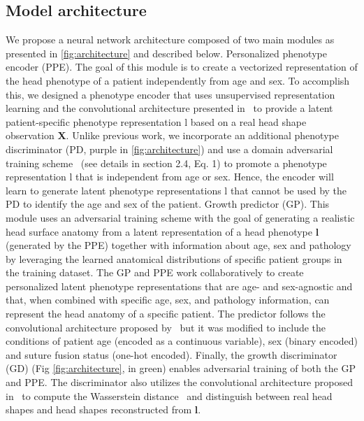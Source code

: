\documentclass[conference]{IEEEtran}
\begin{document}
\subsection{Model architecture}
We propose a neural network architecture composed of two main modules as presented in \ref{fig:architecture} and described below.
Personalized phenotype encoder (PPE). The goal of this module is to create a vectorized representation of the head phenotype of a patient independently from age and sex. To accomplish this, we designed a phenotype encoder that uses unsupervised representation learning and the convolutional architecture presented in~\cite{Radford2016Unsupervised} to provide a latent patient-specific phenotype representation l based on a real head shape observation \textbf{X}. Unlike previous work, we incorporate an additional phenotype discriminator (PD, purple in \ref{fig:architecture}) and use a domain adversarial training scheme~\cite{Ganin2016Domain-Adversarial} (see details in section 2.4, Eq. 1)%
to promote a phenotype representation l that is independent from age or sex. Hence, the encoder will learn to generate latent phenotype representations l that cannot be used by the PD to identify the age and sex of the patient.
Growth predictor (GP). This module uses an adversarial training scheme with the goal of generating a realistic head surface anatomy from a latent representation of a head phenotype \textbf{l} (generated by the PPE) together with information about age, sex and pathology by leveraging the learned anatomical distributions of specific patient groups in the training dataset. The GP and PPE work collaboratively to create personalized latent phenotype representations that are age- and sex-agnostic and that, when combined with specific age, sex, and pathology information, can represent the head anatomy of a specific patient. The predictor follows the convolutional architecture proposed by~\cite{Radford2016Unsupervised} but it was modified to include the conditions of patient age (encoded as a continuous variable), sex (binary encoded) and suture fusion status (one-hot encoded).
Finally, the growth discriminator (GD) (Fig \ref{fig:architecture}, in green) enables adversarial training of both the GP and PPE. The discriminator also utilizes the convolutional architecture proposed in~\cite{Radford2016Unsupervised} to compute the Wasserstein distance~\cite{Gulrajani2017Improved} and distinguish between real head shapes and head shapes reconstructed from \textbf{l}.
\end{document}
